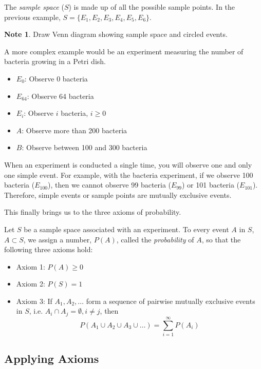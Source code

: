\documentclass[11pt]{article}
\theoremstyle{definition}
\newtheorem{note}{Note}
\begin{document}
The \textit{sample space} ($S$) is made up of all the possible sample points. In the previous example, $S = \{E_1, E_2, E_3, E_4, E_5, E_6\}$.

\begin{note}
	Draw Venn diagram showing sample space and circled events.
\end{note}

A more complex example would be an experiment measuring the number of bacteria growing in a Petri dish.

\begin{itemize}[label={}]
	\setlength\itemsep{0em}
	\item $E_0$: Observe 0 bacteria
	\item $E_{64}$: Observe 64 bacteria
	\item $E_i$: Observe $i$ bacteria, $i \geq 0$
	\item $A$: Observe more than 200 bacteria
	\item $B$: Observe between 100 and 300 bacteria
\end{itemize}

When an experiment is conducted a single time, you will observe one and only one simple event. For example, with the bacteria experiment, if we observe 100 bacteria ($E_{100}$), then we cannot observe 99 bacteria ($E_{99}$) or 101 bacteria ($E_{101}$). Therefore, simple events or sample points are mutually exclusive events.

This finally brings us to the three axioms of probability.

\begin{shaded}
	Let $S$ be a sample space associated with an experiment. To every event $A$ in $S$, $A \subset S$, we assign a number, $P(A)$, called the \textit{probability} of $A$, so that the following three axioms hold:
	\begin{itemize}[label={}]
		\setlength\itemsep{0em}
		\item Axiom 1: $P(A) \geq 0$
		\item Axiom 2: $P(S) = 1$
		\item Axiom 3: If $A_1, A_2, \ldots$ form a sequence of pairwise mutually exclusive events in $S$, i.e. $A_i \cap A_j = \emptyset, i \neq j$, then
		$$
			P(A_1 \cup A_2 \cup A_3 \cup \ldots) = \sum_{i=1}^\infty P(A_i)
		$$
	\end{itemize}
\end{shaded}

\subsection{Applying Axioms}
\end{document}
